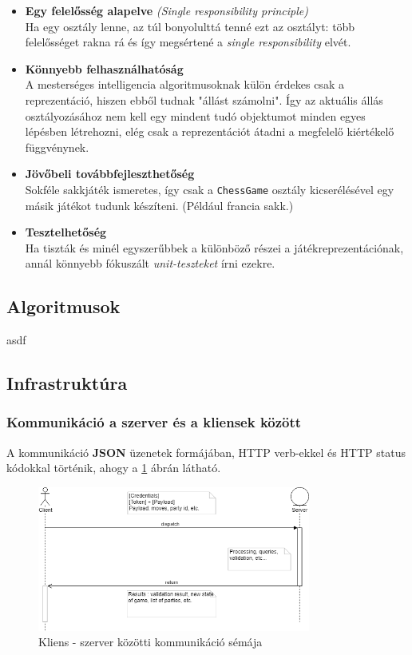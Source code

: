 \documentclass[twoside, a4paper, 12pt]{article}
\begin{document}
\begin{itemize}
	\item \textbf{Egy felelősség alapelve} \textit{(Single responsibility principle)}\cite{SingleResponsibilityHu}~\cite{SingleResponsibilityEn}~\cite{SOLID}~ \\
	Ha egy osztály lenne, az túl bonyolulttá tenné ezt az osztályt: több felelősséget rakna rá és így megsértené a \textit{single responsibility} elvét.
	
	\item \textbf{Könnyebb felhasználhatóság} \\
	A mesterséges intelligencia algoritmusoknak külön érdekes csak a reprezentáció, hiszen ebből tudnak "állást számolni". Így az aktuális állás osztályozásához nem kell egy mindent tudó objektumot minden egyes lépésben létrehozni, elég csak a reprezentációt átadni a megfelelő kiértékelő függvénynek.
	
	\item \textbf{Jövőbeli továbbfejleszthetőség} \\
	Sokféle sakkjáték ismeretes, így csak a \texttt{ChessGame} osztály kicserélésével egy másik játékot tudunk készíteni. (Például francia sakk.)
	
	\item \textbf{Tesztelhetőség} \\
	Ha tiszták és minél egyszerűbbek a különböző részei a játékreprezentációnak, annál könnyebb fókuszált \textit{unit-teszteket} írni ezekre.
\end{itemize}

\subsection{Algoritmusok}
asdf
\subsection{Infrastruktúra}
\subsubsection{Kommunikáció a szerver és a kliensek között}
A kommunikáció \textbf{JSON} üzenetek formájában, HTTP verb-ekkel és HTTP status kódokkal történik, ahogy a \ref{fig:clientServerCommunication} ábrán látható.

\begin{figure}[htbp]
	\centering
	\includegraphics[width=0.8\textwidth]{img/clientServerCommunication.png}
	\caption{Kliens - szerver közötti kommunikáció sémája}
	\label{fig:clientServerCommunication}
\end{figure}
\end{document}
